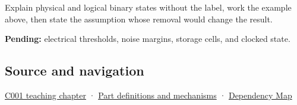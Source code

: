 Explain physical and logical binary states without the label, work the example above, then state the assumption whose removal would change the result.

\textbf{Pending:} electrical thresholds, noise margins, storage cells, and clocked state.

\subsection{Source and navigation}\label{appendix-ea798b1ceb35-source-and-navigation}

\hyperref[01-foundations-i-ch001-from-a-signal-to-an-interpretation]{C001 teaching chapter} · \hyperref[appendix-fd090d982a15]{Part definitions and mechanisms} · \hyperref[appendix-4ad47bdd269a]{Dependency Map}
